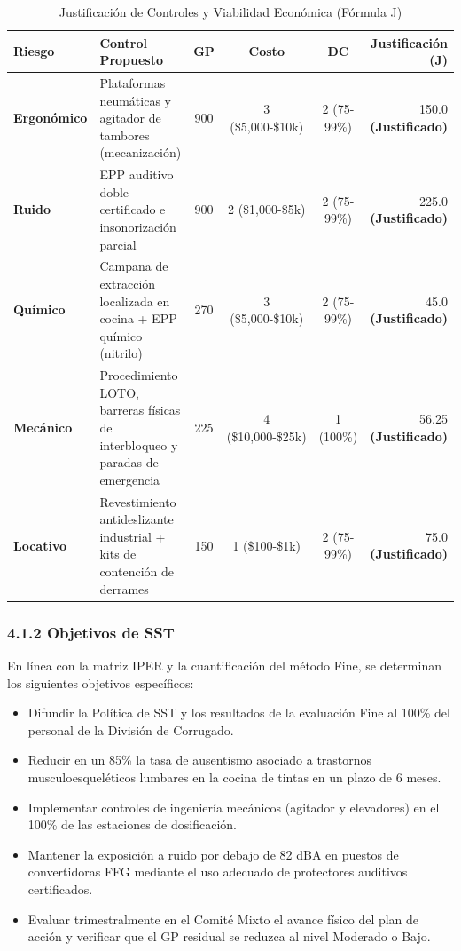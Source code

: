 \documentclass[11pt, letterpaper]{article}
\begin{document}
\begin{table}[H]
    \centering
    \small
    \caption{Justificación de Controles y Viabilidad Económica (Fórmula J)}
    \begin{tabular}{lp{5cm}cccr}
        \toprule
        \textbf{Riesgo} & \textbf{Control Propuesto} & \textbf{GP} & \textbf{Costo} & \textbf{DC} & \textbf{Justificación (J)} \\
        \midrule
        \textbf{Ergonómico} & Plataformas neumáticas y agitador de tambores (mecanización) & 900 & 3 (\$5,000-\$10k) & 2 (75-99\%) & 150.0 \textbf{(Justificado)} \\
        \textbf{Ruido} & EPP auditivo doble certificado e insonorización parcial & 900 & 2 (\$1,000-\$5k) & 2 (75-99\%) & 225.0 \textbf{(Justificado)} \\
        \textbf{Químico} & Campana de extracción localizada en cocina + EPP químico (nitrilo) & 270 & 3 (\$5,000-\$10k) & 2 (75-99\%) & 45.0 \textbf{(Justificado)} \\
        \textbf{Mecánico} & Procedimiento LOTO, barreras físicas de interbloqueo y paradas de emergencia & 225 & 4 (\$10,000-\$25k) & 1 (100\%) & 56.25 \textbf{(Justificado)} \\
        \textbf{Locativo} & Revestimiento antideslizante industrial + kits de contención de derrames & 150 & 1 (\$100-\$1k) & 2 (75-99\%) & 75.0 \textbf{(Justificado)} \\
        \bottomrule
    \end{tabular}
\end{table}

\subsubsection{4.1.2 Objetivos de SST}
En línea con la matriz IPER y la cuantificación del método Fine, se determinan los siguientes objetivos específicos:
\begin{itemize}
    \item Difundir la Política de SST y los resultados de la evaluación Fine al 100\% del personal de la División de Corrugado.
    \item Reducir en un 85\% la tasa de ausentismo asociado a trastornos musculoesqueléticos lumbares en la cocina de tintas en un plazo de 6 meses.
    \item Implementar controles de ingeniería mecánicos (agitador y elevadores) en el 100\% de las estaciones de dosificación.
    \item Mantener la exposición a ruido por debajo de 82 dBA en puestos de convertidoras FFG mediante el uso adecuado de protectores auditivos certificados.
    \item Evaluar trimestralmente en el Comité Mixto el avance físico del plan de acción y verificar que el GP residual se reduzca al nivel Moderado o Bajo.
\end{itemize}
\end{document}
